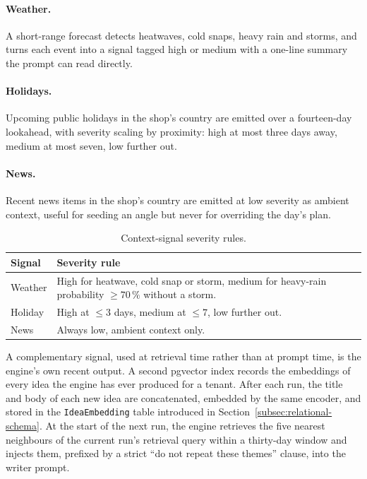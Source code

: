 \paragraph{Weather.} A short-range forecast detects heatwaves, cold snaps, heavy rain and storms, and turns each event into a signal tagged high or medium with a one-line summary the prompt can read directly.

\paragraph{Holidays.} Upcoming public holidays in the shop's country are emitted over a fourteen-day lookahead, with severity scaling by proximity: high at most three days away, medium at most seven, low further out.

\paragraph{News.} Recent news items in the shop's country are emitted at low severity as ambient context, useful for seeding an angle but never for overriding the day's plan.

\begin{table}[!ht]
\centering
\caption{Context-signal severity rules.}
\label{tab:rec-signals}
\small
\renewcommand{\arraystretch}{1.3}
\begin{tabularx}{\textwidth}{|>{\raggedright\arraybackslash}p{2.4cm}|Y|}
\hline
\textbf{Signal} & \textbf{Severity rule} \\
\hline
Weather  & High for heatwave, cold snap or storm, medium for heavy-rain probability $\geq 70\,\%$ without a storm. \\
\hline
Holiday  & High at $\leq 3$ days, medium at $\leq 7$, low further out. \\
\hline
News     & Always low, ambient context only. \\
\hline
\end{tabularx}
\end{table}

A complementary signal, used at retrieval time rather than at prompt time, is the engine's own recent output. A second pgvector index records the embeddings of every idea the engine has ever produced for a tenant. After each run, the title and body of each new idea are concatenated, embedded by the same encoder, and stored in the \texttt{IdeaEmbedding} table introduced in Section~\ref{subsec:relational-schema}. At the start of the next run, the engine retrieves the five nearest neighbours of the current run's retrieval query within a thirty-day window and injects them, prefixed by a strict ``do not repeat these themes'' clause, into the writer prompt.

